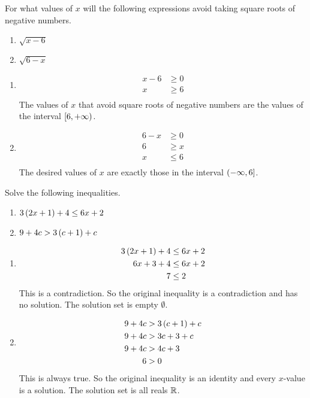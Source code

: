 \begin{example}
	For what values of \(x\) will the following expressions avoid 
	taking square roots of negative numbers.
	
	\begin{enumerate}
		\item \(\sqrt{x-6}\)
		\item \(\sqrt{6-x}\)
	\end{enumerate}
	
	\begin{enumerate}
		\item \begin{align*}
			x - 6 & \geq 0 \\
			x & \geq 6 \\
		\end{align*}
		The values of \(x\) that avoid square roots of negative 
		numbers are the values of the interval 
		\(\left[ 6, +\infty\right)\).
		
		\item \begin{align*}
			6 - x & \geq 0 \\
			6 & \geq x \\
			x & \leq 6 \\
		\end{align*}
		The desired values of \(x\) are exactly those in the interval 
		\(\left( -\infty, 6\right]\).
	\end{enumerate}
\end{example}

\begin{example}
	Solve the following inequalities.
	\begin{enumerate}
		\item \(3\left( 2 x + 1\right) + 4\leq 6 x + 2\)
		\item \(9 + 4 c> 3\left( c + 1\right) + c\)
	\end{enumerate}
	
	\begin{enumerate}
		\item \begin{align*}
			3\left( 2 x + 1\right) + 4 & \leq 6 x + 2 \\
			6 x + 3 + 4 & \leq 6 x + 2 \\
			7 & \leq 2 \\
		\end{align*}
		This is a contradiction. So the original inequality is a 
		contradiction and has no solution. The solution set is empty 
		\(\emptyset\).
		
		\item \begin{align*}
			9 + 4 c & > 3\left( c + 1\right) + c \\
			9 + 4 c & > 3 c + 3 + c \\
			9 + 4 c & > 4 c + 3 \\
			6 & > 0 \\
		\end{align*}
		This is always true. So the original inequality is an identity 
		and every \(x\)-value is a solution. The solution set is all 
		reals \(\mathbb{R}\).
	\end{enumerate}
\end{example}

